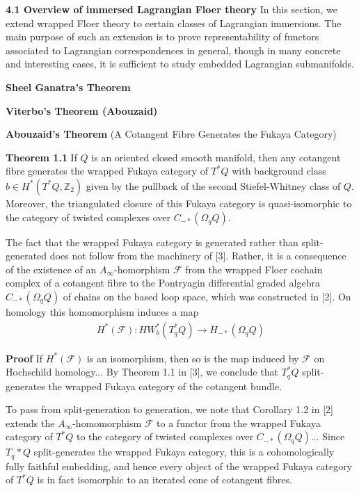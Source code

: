 \documentclass[hidelinks, 12pt]{article}
\theoremstyle{mydefstyle}
\theoremstyle{mythmstyle}
\begin{document}
\textbf{4.1 Overview of immersed Lagrangian Floer theory} In this section, we extend wrapped Floer theory to certain classes of Lagrangian immersions. The main purpose of such an extension is to prove representability of functors associated to Lagrangian correspondences in general, though in many concrete and interesting cases, it is sufficient to study embedded Lagrangian submanifolds. 

\textbf{Sheel Ganatra's Theorem}

\textbf{Viterbo's Theorem (Abouzaid)}

\textbf{Abouzaid's Theorem} (A Cotangent Fibre Generates the Fukaya Category)

\textbf{Theorem 1.1} If $Q$ is an oriented closed smooth manifold, then any cotangent fibre generates the wrapped Fukaya category of $T^*Q$ with background class $b \in H^*(T^*Q, \mathbb{Z}_2)$ given by the pullback of the second Stiefel-Whitney class of $Q$. Moreover, the triangulated closure of this Fukaya category is quasi-isomorphic to the category of twisted complexes over $C_{-*}(\Omega_q Q)$. 

The fact that the wrapped Fukaya category is generated rather than split-generated does not follow from the machinery of [3]. Rather, it is a consequence of the existence of an $A_{\infty}$-homorphism $\mathcal{F}$ from the wrapped Floer cochain complex of a cotangent fibre to the Pontryagin differential graded algebra $C_{-*}(\Omega_q Q)$ of chains on the based loop space, which was constructed in [2]. On homology this homomorphism induces a map
\begin{gather*}
H^*(\mathcal{F}) : HW_b^*(T_q^*Q) \to H_{-*}(\Omega_q Q) \tag{1.1}
\end{gather*}

\textbf{Proof} If $H^*(\mathcal{F})$ is an isomorphism, then so is the map induced by $\mathcal{F}$ on Hochschild homology... By Theorem 1.1 in [3], we conclude that $T_q^*Q$ split-generates the wrapped Fukaya category of the cotangent bundle.

To pass from split-generation to generation, we note that Corollary 1.2 in [2] extends the $A_{\infty}$-homomorphism $\mathcal{F}$ to a functor from the wrapped Fukaya category of $T^*Q$ to the category of twisted complexes over $C_{-*}(\Omega_qQ)$... Since $T_q*Q$ split-generates the wrapped Fukaya category, this is a cohomologically fully faithful embedding, and hence every object of the wrapped Fukaya category of $T^*Q$ is in fact isomorphic to an iterated cone of cotangent fibres. 
\end{document}
